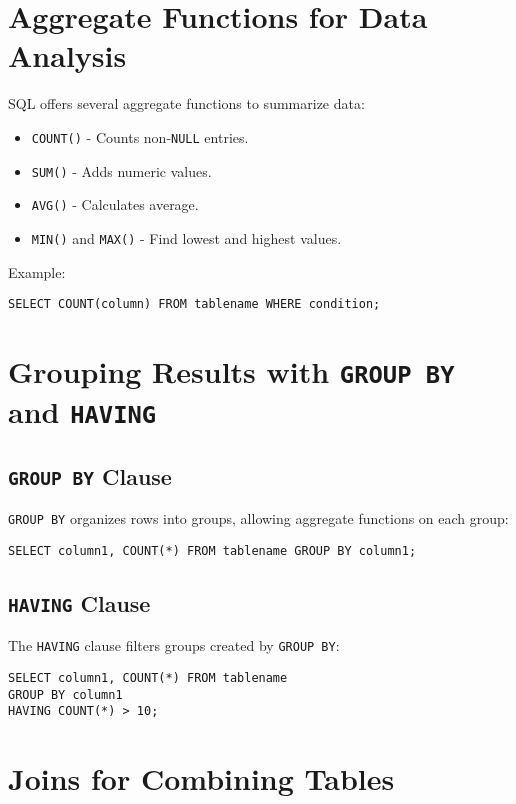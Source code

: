 \documentclass{article}
\begin{document}
\section{Aggregate Functions for Data Analysis}
SQL offers several aggregate functions to summarize data:
\begin{itemize}
    \item \texttt{COUNT()} - Counts non-\texttt{NULL} entries.
    \item \texttt{SUM()} - Adds numeric values.
    \item \texttt{AVG()} - Calculates average.
    \item \texttt{MIN()} and \texttt{MAX()} - Find lowest and highest values.
\end{itemize}
Example:
\begin{verbatim}
SELECT COUNT(column) FROM tablename WHERE condition;
\end{verbatim}

\section{Grouping Results with \texttt{GROUP BY} and \texttt{HAVING}}
\subsection{\texttt{GROUP BY} Clause}
\texttt{GROUP BY} organizes rows into groups, allowing aggregate functions on each group:
\begin{verbatim}
SELECT column1, COUNT(*) FROM tablename GROUP BY column1;
\end{verbatim}

\subsection{\texttt{HAVING} Clause}
The \texttt{HAVING} clause filters groups created by \texttt{GROUP BY}:
\begin{verbatim}
SELECT column1, COUNT(*) FROM tablename
GROUP BY column1
HAVING COUNT(*) > 10;
\end{verbatim}

\section{Joins for Combining Tables}
\end{document}
